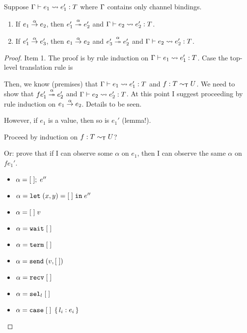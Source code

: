 \newpage
\begin{lemma}
  Suppose $\Ctxt \vdash e_1 \leadsto e'_1 : T$ where $\Ctxt$ contains only
  channel bindings. \begin{enumerate}
  \item If $\reduce[\alpha]{e_1}{e_2}$, then
    $\reducemany[\alpha]{e'_1}{e'_2}$ and $\Ctxt \vdash e_2 \leadsto e'_2 : T$.
  \item If $\reduce[\alpha]{e'_1}{e'_3}$, then $\reduce[\alpha]{e_1}{e_2}$ and
    $\reducemany[\alpha]{e'_3}{e'_2}$ and $\Ctxt \vdash e_2 \leadsto e'_2 : T$.
  \end{enumerate}
\end{lemma}
\begin{proof} Item 1.
  The proof is by rule induction on $\Ctxt \vdash e_1 \leadsto e'_1 : T$.
  Case the top-level translation rule is
  \begin{mathpar}
  \end{mathpar}

  Then, we know (premises) that $\Ctxt \vdash e_1 \leadsto e'_1 : T$ and $f : T
  \eqt U$.
  We need to show that $\reducemany[\alpha]{f e_1'}{e'_2}$ and $\Ctxt \vdash e_2 \leadsto e'_2 : T$.
  At this point I suggest proceeding by rule induction on
  $\reduce[\alpha]{e_1}{e_2}$. Details to be seen.


  However, if $e_1$ is a value, then so is $e_1'$ (lemma!). 

  Proceed by induction on $f : T \eqt U$?

  Or: prove that if I can observe some $\alpha$ on $e_1$, then I can
  observe the same $\alpha$ on $f e_1'$.

  \begin{itemize}
  \item $\alpha = \ELetU\EHole{e''}$
  \item $\alpha = \ELetP xy\EHole{e''}$
  \item $\alpha = \EHole\; v$
  \item $\alpha = \EWait\EHole$
  \item $\alpha = \ETerm\EHole$
  \item $\alpha = \ESend{v}\EHole$
  \item $\alpha = \ERecv\EHole$
  \item $\alpha = \ESelect l \EHole$
  \item $\alpha = \ECase\EHole{l_i: e_i}$
  \end{itemize}
  
\end{proof}

